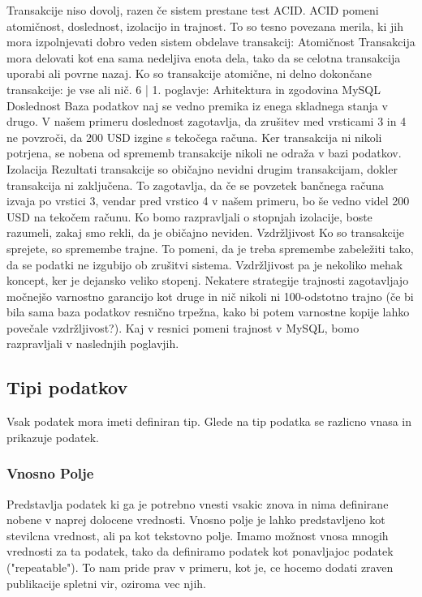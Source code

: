 \documentclass[a4paper, 12pt]{book}
\begin{document}
Transakcije niso dovolj, razen če sistem prestane test ACID. ACID pomeni atomičnost, doslednost, izolacijo in trajnost. To so tesno povezana merila, ki jih mora izpolnjevati dobro veden sistem obdelave transakcij:
Atomičnost
Transakcija mora delovati kot ena sama nedeljiva enota dela, tako da se celotna transakcija uporabi ali povrne nazaj. Ko so transakcije atomične, ni delno dokončane transakcije: je vse ali nič.
  6 | 1. poglavje: Arhitektura in zgodovina MySQL
Doslednost
Baza podatkov naj se vedno premika iz enega skladnega stanja v drugo. V našem primeru doslednost zagotavlja, da zrušitev med vrsticami 3 in 4 ne povzroči, da 200 USD izgine s tekočega računa. Ker transakcija ni nikoli potrjena, se nobena od sprememb transakcije nikoli ne odraža v bazi podatkov.
Izolacija
Rezultati transakcije so običajno nevidni drugim transakcijam, dokler transakcija ni zaključena. To zagotavlja, da če se povzetek bančnega računa izvaja po vrstici 3, vendar pred vrstico 4 v našem primeru, bo še vedno videl 200 USD na tekočem računu. Ko bomo razpravljali o stopnjah izolacije, boste razumeli, zakaj smo rekli, da je običajno neviden.
Vzdržljivost
Ko so transakcije sprejete, so spremembe trajne. To pomeni, da je treba spremembe zabeležiti tako, da se podatki ne izgubijo ob zrušitvi sistema. Vzdržljivost pa je nekoliko mehak koncept, ker je dejansko veliko stopenj. Nekatere strategije trajnosti zagotavljajo močnejšo varnostno garancijo kot druge in nič nikoli ni 100-odstotno trajno (če bi bila sama baza podatkov resnično trpežna, kako bi potem varnostne kopije lahko povečale vzdržljivost?). Kaj v resnici pomeni trajnost v MySQL, bomo razpravljali v naslednjih poglavjih.


\subsection{Tipi podatkov}
Vsak podatek mora imeti definiran tip. Glede na tip podatka se razlicno vnasa in prikazuje podatek. 

\subsubsection{Vnosno Polje}
Predstavlja podatek ki ga je potrebno vnesti vsakic znova in nima definirane nobene v naprej dolocene vrednosti. Vnosno polje je lahko predstavljeno kot stevilcna vrednost, ali pa kot tekstovno polje. 
Imamo možnost vnosa mnogih vrednosti za ta podatek, tako da definiramo podatek kot ponavljajoc podatek ("repeatable"). To nam pride prav v primeru, kot je, ce hocemo dodati zraven publikacije spletni vir, oziroma vec njih.
\end{document}
